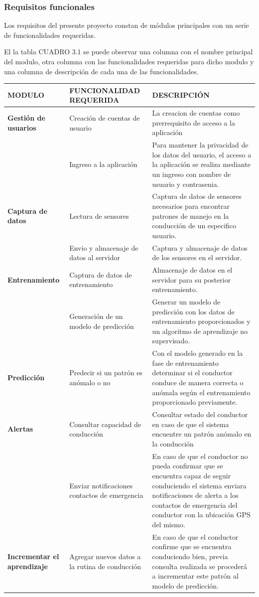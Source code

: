 \subsubsection{Requisitos funcionales}
Los requisitos del presente proyecto constan de     módulos principales con un serie de funcionalidades requeridas.

El la tabla CUADRO 3.1  se puede observar una columna con el nombre principal del modulo, otra columna con las funcionalidades requeridas para dicho modulo y una columna de descripción de cada una de las funcionalidades.


\begin{table}[h!]
\begin{center}
\begin{tabular}[c]{|p{4cm}|p{4cm}|p{6cm}|}
\hline
\textbf{MODULO} & \textbf{FUNCIONALIDAD REQUERIDA} & \textbf{DESCRIPCIÓN}\\
\hline 
\textbf{Gestión de usuarios} & Creación de cuentas de usuario & La creacion de cuentas como prerrequisito de acceso a la aplicación\\
\hline 
&Ingreso a la aplicación&Para mantener la privacidad de los datos del usuario, el acceso a la aplicación se realiza mediante un ingreso con nombre de usuario  y contrasenia.\\
\hline 
\textbf{Captura de datos}&Lectura de sensores&Captura de datos de sensores necesarios para encontrar patrones de manejo en la conducción de un especifico usuario.\\
\hline 
&Envio y almacenaje de datos al servidor&Captura y almacenaje de datos de los sensores en el servidor.\\
\hline 
\textbf{Entrenamiento}&Captura de datos de entrenamiento&Almacenaje de datos en el servidor para su posterior  entrenamiento.\\
\hline
&Generación de un modelo de predicción&Generar un modelo de predicción con los datos de entrenamiento proporcionados y un algoritmo de aprendizaje no supervisado.\\
\hline
\textbf{Predicción}&Predecir si un patrón es anómalo o no&Con el modelo generado en la fase de entrenamiento determinar si el conductor conduce de manera correcta o anómala según el entrenamiento proporcionado previamente.\\
\hline
\textbf{Alertas}&Consultar capacidad de conducción&Consultar estado del conductor en caso de que el sistema encuentre un patrón anómalo en la conducción\\
\hline
&Enviar notificaciones contactos de emergencia&En caso de que el conductor no pueda confirmar que se encuentra capaz de seguir conduciendo el sistema enviara notificaciones de alerta a los contactos de emergencia del conductor con la ubicación GPS del mismo.\\
\hline
\textbf{Incrementar el aprendizaje}&Agregar nuevos datos a la rutina de conducción&En caso de que el conductor confirme que se encuentra conduciendo bien, previa consulta realizada se procederá a incrementar este patrón al modelo de predicción.\\
\hline


\end{tabular}
\end{center}
\end{table}
